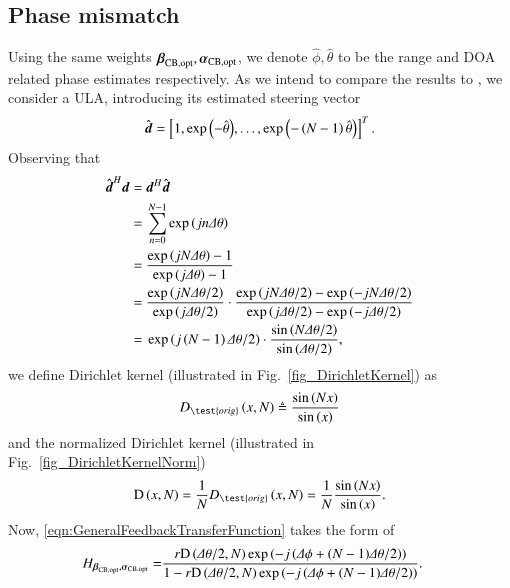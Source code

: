\subsection{Phase mismatch}
Using the same weights $\boldsymbol{\beta}_{\text{CB,opt}},\boldsymbol{\alpha}_{\text{CB,opt}}$, we denote $\hat{\phi},\hat{\theta}$ to be the range and DOA related phase estimates respectively.
As we intend to compare the results to \cite{van2004optimum}, we consider a ULA, introducing its estimated steering vector
\begin{equation}\label{eq_est_d_ULA}
\hat{\boldsymbol{d}} = \left[{1, \exp{\left({-\hat{\theta}}\right)}, \hdots, \exp{\left({-\left({N-1}\right)\hat{\theta}}\right)}}\right]^{T}.
\end{equation}
Observing that
\begin{equation*}
    \begin{split}
        \hat{\vecnot{d}}^{H}\vecnot{d} =&\ \vecnot{d}^{H}\hat{\vecnot{d}}\\
        =&\ \sum_{n=0}^{N-1}\exp{\rBrace{jn\Delta\theta}} \\
        =&\ \frac{\exp{\rBrace{jN\Delta\theta}}-1}{\exp{\rBrace{j\Delta\theta}}-1}\\
        =&\ \frac{\exp{\rBrace{jN\Delta\theta/2}}}{\exp{\rBrace{j\Delta\theta/2}}}\cdot
        \frac{\exp{\rBrace{jN\Delta\theta/2}}-\exp{\rBrace{-jN\Delta\theta/2}}}
        {\exp{\rBrace{j\Delta\theta/2}}-\exp{\rBrace{-j\Delta\theta/2}}}\\
        =&\ \exp{\rBrace{j\rBrace{N-1}\Delta\theta/2}}\cdot
        \frac{\sin{\rBrace{N\Delta\theta/2}}}
        {\sin{\rBrace{\Delta\theta/2}}},
    \end{split}
\end{equation*}
we define Dirichlet kernel (illustrated in Fig.~\ref{fig_DirichletKernel}) as
\[
D_{\test{orig}}\rBrace{x,N}\triangleq\frac{\sin\rBrace{Nx}}{\sin\rBrace{x}}
\]
and the normalized Dirichlet kernel (illustrated in Fig.~\ref{fig_DirichletKernelNorm})
\[
\D{x}{N}=\frac{1}{N}D_{\test{orig}}\rBrace{x,N}=\frac{1}{N}\frac{\sin\rBrace{Nx}}{\sin\rBrace{x}}.
\]
Now, \eqref{eqn:GeneralFeedbackTransferFunction} takes the form of
\begin{equation}\label{eq:alpha_beta_hat}
    \begin{split}
        H_{\boldsymbol{\beta}_{\text{CB,opt}},\boldsymbol{\alpha}_{\text{CB,opt}}}
        = &\frac{r\text{D}\left({\Delta\theta/2,N}\right)\exp\left({-j\left({\Delta\phi+(N-1)\Delta\theta/2}\right)}\right)}{1-r\text{D}\left({\Delta\theta/2,N}\right)\exp\left({-j\left({\Delta\phi+(N-1)\Delta\theta/2}\right)}\right)}.
    \end{split}
\end{equation}
